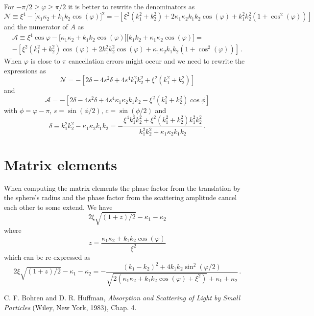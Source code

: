 \documentclass[onecolumn%
              ,superscriptaddress%
              ,aps%
              ,pra]{revtex4}
\begin{document}
For $-\pi/2 \geq \varphi \geq \pi/2$ it is better to rewrite the denominators as
\begin{equation}
\mathcal{N} \equiv \xi^4-\big[\kappa_1\kappa_2+k_1k_2\cos(\varphi)\big]^2 = -\left[\xi^2(k_1^2 + k_2^2) + 2 \kappa_1 \kappa_2 k_1 k_2 \cos(\varphi) + k_1^2 k_2^2 \left(1 + \cos^2(\varphi)\right)\right]
\end{equation}
and the numerator of $A$ as
\begin{multline}
\mathcal{A}\equiv\xi^4\cos\varphi-\big[\kappa_1\kappa_2+k_1k_2\cos(\varphi)\big] \big[k_1 k_2+\kappa_1\kappa_2\cos(\varphi)\big]= \\-\left[\xi^2(k_1^2 + k_2^2)\cos(\varphi) + 2k_1^2 k_2^2 \cos(\varphi) + \kappa_1 \kappa_2 k_1 k_2\left(1 + \cos^2(\varphi) \right)\right]\,.
\end{multline}
When $\varphi$ is close to $\pi$ cancellation errors might occur and we need to rewrite the expressions as
\begin{equation}
\mathcal{N} = -\left[ 2 \delta - 4 s^2 \delta + 4 s^4 k_1^2 k_2^2 + \xi^2(k_1^2 + k_2^2)\right]
\end{equation}
and
\begin{equation}
\mathcal{A} = -\left[2\delta - 4 s^2 \delta + 4 s^4 \kappa_1 \kappa_2 k_1 k_2 -\xi^2 (k_1^2 + k_2^2)\cos\phi\right]
\end{equation}
with $\phi = \varphi-\pi$, $s = \sin(\phi/2)$, $c = \sin(\phi/2)$ and
\begin{equation}
\delta \equiv k_1^2 k_2^2 - \kappa_1\kappa_2 k_1 k_2 = - \frac{\xi^4 k_1^2 k_2^2 + \xi^2(k_1^2 + k_2^2)k_1^2 k_2^2}{k_1^2k_2^2 + \kappa_1 \kappa_2 k_1 k_2}\,.
\end{equation}

\section{Matrix elements}

When computing the matrix elements the phase factor from the translation by the sphere's radius and the phase factor from the scattering amplitude cancel each other to some extend. We have
\begin{equation}
2\xi \sqrt{(1+z)/2} - \kappa_1 - \kappa_2
\end{equation}
where
\begin{equation}
z = \frac{\kappa_1 \kappa_2 + k_1 k_2 \cos(\varphi)}{\xi^2}
\end{equation}
which can be re-expressed as
\begin{equation}
2\xi \sqrt{(1+z)/2} - \kappa_1 - \kappa_2 = - \frac{(k_1 - k_2)^2 + 4 k_1 k_2 \sin^2(\varphi/2)}{\sqrt{2(\kappa_1 \kappa_2 + k_1 k_2 \cos(\varphi) + \xi^2)} + \kappa_1 + \kappa_2} \,.
\end{equation}


\begin{thebibliography}{99}
C. F. Bohren and D. R. Huffman,
\textit{Absorption and Scattering of Light by Small Particles}
(Wiley, New York, 1983), Chap. 4.

\end{thebibliography}
\end{document}
